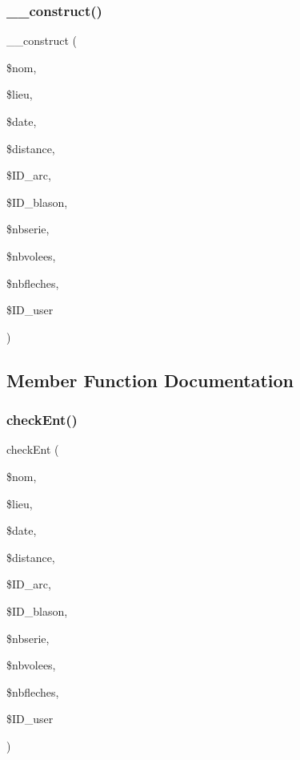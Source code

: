 \subsubsection{\+\_\+\+\_\+construct()}
{\footnotesize\ttfamily \+\_\+\+\_\+construct (\begin{DoxyParamCaption}\item[{}]{\$nom,  }\item[{}]{\$lieu,  }\item[{}]{\$date,  }\item[{}]{\$distance,  }\item[{}]{\$\+I\+D\+\_\+arc,  }\item[{}]{\$\+I\+D\+\_\+blason,  }\item[{}]{\$nbserie,  }\item[{}]{\$nbvolees,  }\item[{}]{\$nbfleches,  }\item[{}]{\$\+I\+D\+\_\+user }\end{DoxyParamCaption})}



\subsection{Member Function Documentation}
\mbox{\label{classentrainement_ab6a177174e7b2d1304bc5ba8f95d64cc}} 
\subsubsection{check\+Ent()}
{\footnotesize\ttfamily check\+Ent (\begin{DoxyParamCaption}\item[{}]{\$nom,  }\item[{}]{\$lieu,  }\item[{}]{\$date,  }\item[{}]{\$distance,  }\item[{}]{\$\+I\+D\+\_\+arc,  }\item[{}]{\$\+I\+D\+\_\+blason,  }\item[{}]{\$nbserie,  }\item[{}]{\$nbvolees,  }\item[{}]{\$nbfleches,  }\item[{}]{\$\+I\+D\+\_\+user }\end{DoxyParamCaption})}

\mbox{\label{classentrainement_a757b3b0b1570d9862062db2d4af9515d}} 
